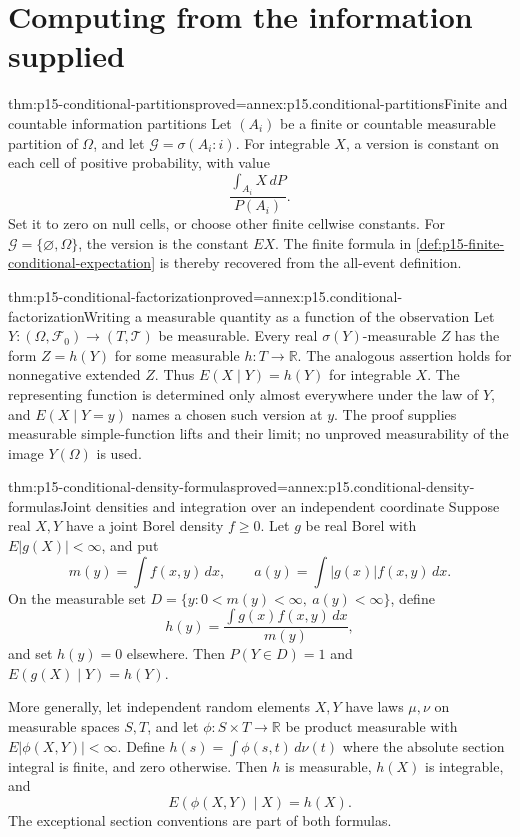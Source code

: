 \section{Computing from the information supplied}
\label{sec:p15-conditional-computations}

\begin{hbtheorem}{thm:p15-conditional-partitions}{proved=annex:p15.conditional-partitions}{Finite and countable information partitions}
Let \((A_i)\) be a finite or countable measurable partition of \(\Omega\),
and let \(\mathcal G=\sigma(A_i:i)\).
For integrable \(X\), a version is constant on each cell of positive
probability, with value
\[
                           \frac{\int_{A_i}X\,dP}{P(A_i)}.
\]
Set it to zero on null cells, or choose other finite cellwise constants.
For \(\mathcal G=\{\varnothing,\Omega\}\), the version is the constant \(EX\).
The finite formula in \cref{def:p15-finite-conditional-expectation}
is thereby recovered from the all-event definition.
\end{hbtheorem}

\begin{hbtheorem}{thm:p15-conditional-factorization}{proved=annex:p15.conditional-factorization}{Writing a measurable quantity as a function of the observation}
Let \(Y:(\Omega,\mathcal F_0)\to(T,\mathcal T)\) be measurable.
Every real \(\sigma(Y)\)-measurable \(Z\) has the form
\(Z=h(Y)\) for some measurable \(h:T\to\mathbb R\).
The analogous assertion holds for nonnegative extended \(Z\).
Thus \(E(X\mid Y)=h(Y)\) for integrable \(X\).
The representing function is determined only almost everywhere under
the law of \(Y\), and \(E(X\mid Y=y)\) names a chosen such version at \(y\).
The proof supplies measurable simple-function lifts and their limit;
no unproved measurability of the image \(Y(\Omega)\) is used.
\end{hbtheorem}

\begin{hbtheorem}{thm:p15-conditional-density-formulas}{proved=annex:p15.conditional-density-formulas}{Joint densities and integration over an independent coordinate}
Suppose real \(X,Y\) have a joint Borel density \(f\geq0\).
Let \(g\) be real Borel with \(E|g(X)|<\infty\), and put
\[
               m(y)=\int f(x,y)\,dx,\qquad
               a(y)=\int|g(x)|f(x,y)\,dx .
\]
On the measurable set \(D=\{y:0<m(y)<\infty,\ a(y)<\infty\}\), define
\[
                           h(y)=\frac{\int g(x)f(x,y)\,dx}{m(y)},
\]
and set \(h(y)=0\) elsewhere. Then \(P(Y\in D)=1\) and
\(E(g(X)\mid Y)=h(Y)\).

More generally, let independent random elements \(X,Y\) have laws
\(\mu,\nu\) on measurable spaces \(S,T\), and let
\(\phi:S\times T\to\mathbb R\) be product measurable with
\(E|\phi(X,Y)|<\infty\).
Define \(h(s)=\int\phi(s,t)\,d\nu(t)\) where the absolute section
integral is finite, and zero otherwise. Then \(h\) is measurable,
\(h(X)\) is integrable, and
\[
                           E(\phi(X,Y)\mid X)=h(X).
\]
The exceptional section conventions are part of both formulas.
\end{hbtheorem}

